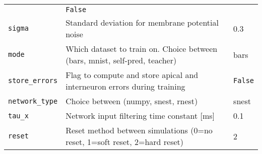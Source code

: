 \begin{table}
\begin{center}
\begin{tabular}{p{}p{}p{}}
      & \texttt{False}
      \\
      \texttt{sigma}               & Standard deviation for membrane potential noise                             & 0.3
      \\
      \texttt{mode}                & Which dataset to train on. Choice between (bars, mnist, self-pred, teacher) & bars
      \\
      \texttt{store\_errors}       & Flag to compute and store apical and interneuron errors during training     &
      \texttt{False}                                                                                                     \\
      \texttt{network\_type}       & Choice between (numpy, snest, rnest)                                        & snest
      \\
      \texttt{tau\_x}              & Network input filtering time constant [ms]                                  & 0.1   \\
      \texttt{reset}               & Reset method between simulations (0=no reset, 1=soft reset, 2=hard reset)   & 2
      \\


\end{tabular}
\end{center}
\end{table}
